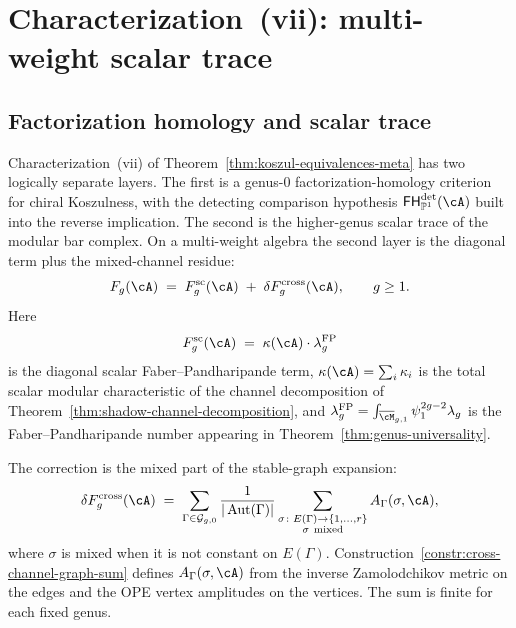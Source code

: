 \chapter[Characterization (vii): multi-weight scalar trace]
{Characterization~\textup{(vii)}: multi-weight scalar trace}
\label{chap:koszulness-vii-multiweight-platonic}

\section{Factorization homology and scalar trace}
\label{sec:kos-vii-setup}

Characterization~\textup{(vii)} of Theorem~\textup{\ref{thm:koszul-equivalences-meta}}
has two logically separate layers. The first is a genus-$0$
factorization-homology criterion for chiral Koszulness, with the
detecting comparison hypothesis
$\mathsf{FH}^{\mathrm{det}}_{\mathbb{P}^1}(\cA)$ built into the
reverse implication. The second is the higher-genus scalar trace of
the modular bar complex. On a multi-weight algebra the second layer is
the diagonal term plus the mixed-channel residue:
\begin{equation}\label{eq:kos-vii-diagonal-plus-cross}
F_g(\cA)
\;=\;
F_g^{\mathrm{sc}}(\cA)
\;+\;
\delta F_g^{\mathrm{cross}}(\cA),
\qquad g\geq 1.
\end{equation}
Here
\[
F_g^{\mathrm{sc}}(\cA)
\;=\;
\kappa(\cA)\cdot\lambda_g^{\mathrm{FP}}
\]
is the diagonal scalar Faber--Pandharipande term,
$\kappa(\cA)=\sum_i\kappa_i$ is the total scalar modular
characteristic of the channel decomposition of
Theorem~\textup{\ref{thm:shadow-channel-decomposition}}, and
$\lambda_g^{\mathrm{FP}}
=\int_{\overline{\cM}_{g,1}}\psi_1^{2g-2}\lambda_g$ is the
Faber--Pandharipande number appearing in
Theorem~\textup{\ref{thm:genus-universality}}.

The correction is the mixed part of the stable-graph expansion:
\begin{equation}\label{eq:kos-vii-correction-graph-sum}
\delta F_g^{\mathrm{cross}}(\cA)
\;=\;
\sum_{\Gamma\in\mathcal{G}_{g,0}}
\frac{1}{|\operatorname{Aut}(\Gamma)|}
\sum_{\substack{\sigma\colon E(\Gamma)\to\{1,\ldots,r\}\\
\sigma\ \mathrm{mixed}}}
A_\Gamma(\sigma,\cA),
\end{equation}
where $\sigma$ is mixed when it is not constant on $E(\Gamma)$.
Construction~\textup{\ref{constr:cross-channel-graph-sum}} defines
$A_\Gamma(\sigma,\cA)$ from the inverse Zamolodchikov metric on the
edges and the OPE vertex amplitudes on the vertices. The sum is finite
for each fixed genus.

